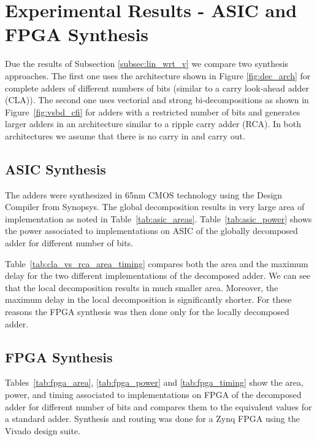 \documentclass[12pt]{toptesi}
\begin{document}
\section{Experimental Results - ASIC and FPGA Synthesis}

Due the results of Subsection \ref{subsec:lin_wrt_v} we compare two synthesis approaches. The first one uses the 
architecture shown in Figure \ref{fig:dec_arch} for complete adders of different numbers of bits (similar to a carry look-ahead adder (CLA)). The second one uses vectorial and strong bi-decompositions as shown in Figure~\ref{fig:vsbd_cfi} for adders with a restricted number of bits and generates larger adders in an architecture similar to a ripple carry adder (RCA). In both architectures we assume that there is no carry in and carry out.

\subsection{ASIC  Synthesis}

The adders were synthesized in 65nm CMOS technology using the Design Compiler from Synopsys. 
The global decomposition results in very large area of implementation as noted in Table~\ref{tab:asic_areas}.
Table~\ref{tab:asic_power} shows the power associated to implementations on ASIC of the globally decomposed adder for different number of bits. 



Table~\ref{tab:cla_vs_rca_area_timing} compares both the area and the maximum delay for the two different implementations of the decomposed adder.
We can see that the local decomposition results in much smaller area.
Moreover, the maximum delay in the local decomposition is significantly shorter.
For these reasons the FPGA synthesis was then done only for the locally decomposed adder.



\subsection{FPGA Synthesis}
Tables~\ref{tab:fpga_area}, \ref{tab:fpga_power} and \ref{tab:fpga_timing} show the area, power, and timing  associated to implementations on FPGA of the decomposed adder for different number of bits and compares them to the equivalent values for a standard adder. 
Synthesis and routing was done for a Zynq FPGA using the Vivado design suite.
\end{document}
